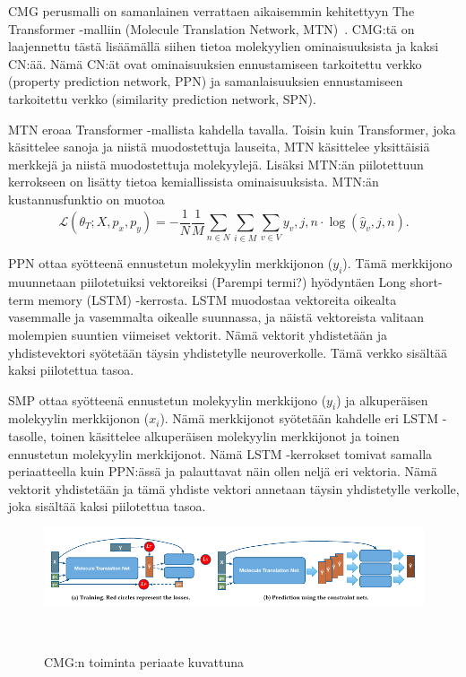 \documentclass[finnish,twoside,censored,tkt,sw-line]{HYthesisML}
\begin{document}
CMG perusmalli on samanlainen verrattaen aikaisemmin kehitettyyn The Transformer -malliin (Molecule Translation Network, MTN)~\cite{TheTransformer}.
CMG:tä on laajennettu tästä lisäämällä siihen tietoa molekyylien ominaisuuksista ja kaksi CN:ää.
Nämä CN:ät ovat ominaisuuksien ennustamiseen tarkoitettu verkko (property prediction network, PPN) ja samanlaisuuksien ennustamiseen tarkoitettu verkko (similarity prediction network, SPN).

MTN eroaa Transformer -mallista kahdella tavalla.
Toisin kuin Transformer, joka käsittelee sanoja ja niistä muodostettuja lauseita, MTN käsittelee yksittäisiä merkkejä ja niistä muodostettuja molekyylejä.
Lisäksi MTN:än piilotettuun kerrokseen on lisätty tietoa kemiallissista ominaisuuksista.
MTN:än kustannusfunktio on muotoa \[\mathcal{L} (\theta_T;X,p_x,p_y) = -\frac{1}{N}\frac{1}{M}\sum_{n \in N}\sum_{i \in M}\sum_{v \in V}y_v,j,n \cdot \log(\hat{y}_v,j,n).\]

PPN ottaa syötteenä ennustetun molekyylin merkkijonon (\(y_i\)).
Tämä merkkijono muunnetaan piilotetuiksi vektoreiksi (Parempi termi?) hyödyntäen Long short-term memory (LSTM) -kerrosta.
LSTM muodostaa vektoreita oikealta vasemmalle ja vasemmalta oikealle suunnassa, ja näistä vektoreista valitaan molempien suuntien viimeiset vektorit.
Nämä vektorit yhdistetään ja yhdistevektori syötetään täysin yhdistetylle neuroverkolle.
Tämä verkko sisältää kaksi piilotettua tasoa.

SMP ottaa syötteenä ennustetun molekyylin merkkijono (\(y_i\)) ja alkuperäisen molekyylin merkkijonon (\(x_i\)).
Nämä merkkijonot syötetään kahdelle eri LSTM -tasolle, toinen käsittelee alkuperäisen molekyylin merkkijonot ja toinen ennustetun molekyylin merkkijonot.
Nämä LSTM -kerrokset tomivat samalla periaatteella kuin PPN:ässä ja palauttavat näin ollen neljä eri vektoria.
Nämä vektorit yhdistetään ja tämä yhdiste vektori annetaan täysin yhdistetylle verkolle, joka sisältää kaksi piilotettua tasoa.

\begin{figure}
    \centering
    \includegraphics[width=\textwidth]{CMG-fig.png}
    \caption{CMG:n toiminta periaate kuvattuna}
    {~\cite{ShinBonggun}}
\end{figure}
\end{document}
